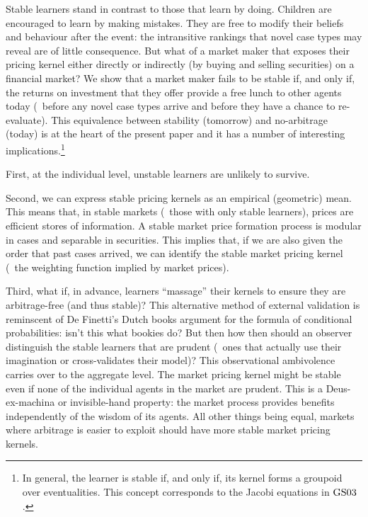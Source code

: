 \documentclass[12pt,a4paper,twoside]{article}
\newcommand{\gsii}{$\textup{GS03}$}
\begin{document}

Stable learners stand in contrast to those that learn by doing. Children are
encouraged to learn by making mistakes. They are free to modify their beliefs
and behaviour after the event: the intransitive rankings that novel case types
may reveal are of little consequence.  But what of a market maker that exposes
their pricing kernel either directly or indirectly (by buying and selling
securities) on a financial market? We show that a market maker fails to be
stable if, and only if, the returns on investment that they offer provide a
free lunch to other agents today (\ie\ before any novel case types arrive and
before they have a chance to re-evaluate).  This equivalence between stability
(tomorrow) and no-arbitrage (today) is at the heart of the present paper and it
has a number of interesting implications.\footnote{In general, the learner is
stable if, and only if, its kernel forms a groupoid over eventualities. This
concept corresponds to the Jacobi equations in \gsii.}

First, at the individual level, unstable learners are unlikely to survive.

Second, we can express stable pricing kernels as an empirical (geometric) mean.
This means that, in stable markets (\ie\ those with only stable learners),
prices are efficient stores of information. A stable market price formation
process is modular in cases and separable in securities. This implies that, if
we are also given the order that past cases arrived, we can identify the stable
market pricing kernel (\ie\ the weighting function implied by market prices).
 
Third, what if, in advance, learners ``massage'' their kernels to ensure they
are arbitrage-free (and thus stable)? This alternative method of external
validation is reminscent of De Finetti's Dutch books argument for the formula
of conditional probabilities: isn't this what bookies do?  But then how then
should an observer distinguish the stable learners that are prudent (\ie\ ones
that actually use their imagination or cross-validates their model)?  This
observational ambivolence carries over to the aggregate level.  The market
pricing kernel might be stable even if none of the individual agents in the
market are prudent.  This is a Deus-ex-machina or invisible-hand
property: the market process provides benefits independently of the wisdom of
its agents.  All other things being equal, markets where arbitrage is easier to
exploit should have more stable market pricing kernels.
 
\end{document}
